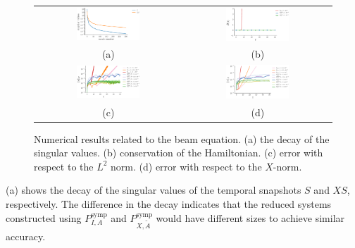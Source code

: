 \begin{figure}[t] \label{fig:1}
\begin{tabular}{cc}
\includegraphics[width=0.45\textwidth]{./figs/beam/singulars} & \includegraphics[width=0.45\textwidth]{./figs/beam/energy} \\
(a) & (b) \\
\includegraphics[width=0.45\textwidth]{./figs/beam/l2_norm} & \includegraphics[width=0.45\textwidth]{./figs/beam/energy_norm} \\
(c) & (d) \\
\end{tabular}
\caption{Numerical results related to the beam equation. (a) the decay of the singular values. (b) conservation of the Hamiltonian. (c) error with respect to the $L^2$ norm. (d) error with respect to the $X$-norm.}
\end{figure}

(a) shows the decay of the singular values of the temporal snapshots $S$ and $XS$, respectively. The difference in the decay indicates that the reduced systems constructed using $P_{I,A}^{\text{symp}}$ and $P_{X,\tilde A}^{\text{symp}}$ would have different sizes to achieve similar accuracy.

